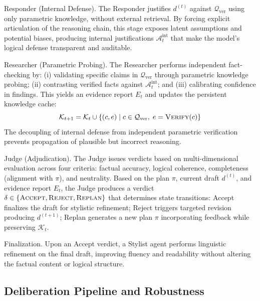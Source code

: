 \documentclass{article}
\begin{document}
Responder (Internal Defense).
The Responder justifies $d^{(t)}$ against $\mathcal{Q}_{\text{ver}}$ using only parametric knowledge, without external retrieval. By forcing explicit articulation of the reasoning chain, this stage exposes latent assumptions and potential biases, producing internal justifications $\mathcal{A}_t^{\text{int}}$ that make the model's logical defense transparent and auditable.

Researcher (Parametric Probing).
The Researcher performs independent fact-checking by: (i) validating specific claims in $\mathcal{Q}_{\text{ver}}$ through parametric knowledge probing; (ii) contrasting verified facts against $\mathcal{A}_t^{\text{int}}$; and (iii) calibrating confidence in findings. This yields an evidence report $E_t$ and updates the persistent knowledge cache:
\begin{equation}
    \mathcal{K}_{t+1} = \mathcal{K}_t \cup \{(c, e) \mid c \in \mathcal{Q}_{\text{ver}},\; e = \textsc{Verify}(c)\}
\end{equation}
The decoupling of internal defense from independent parametric verification prevents propagation of plausible but incorrect reasoning.

Judge (Adjudication).
The Judge issues verdicts based on multi-dimensional evaluation across four criteria: factual accuracy, logical coherence, completeness (alignment with $\pi$), and neutrality. Based on the plan $\pi$, current draft $d^{(t)}$, and evidence report $E_t$, the Judge produces a verdict $\delta \in \{\textsc{Accept}, \textsc{Reject}, \textsc{Replan}\}$ that determines state transitions: Accept finalizes the draft for stylistic refinement; Reject triggers targeted revision producing $d^{(t+1)}$; Replan generates a new plan $\pi$ incorporating feedback while preserving $\mathcal{K}_t$.

Finalization.
Upon an Accept verdict, a Stylist agent performs linguistic refinement on the final draft, improving fluency and readability without altering the factual content or logical structure.

\subsection{Deliberation Pipeline and Robustness}
\label{subsec:pipeline}
\end{document}
